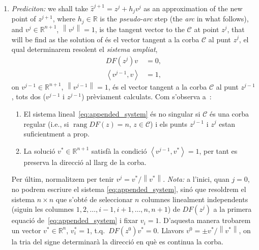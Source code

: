 \documentclass[11pt,reqno,twoside]{article}
\newcommand{\R}{\ensuremath{\mathbb{R}}}
\theoremstyle{remark}
\begin{document}
\begin{enumerate}[label = \emph{\arabic*.}]
  \item \emph{Prediciton:} we shall take $\hat{z}^{j+1} = z^{j} + h_{j}
    v^{j}$ as an approximation of the new point of
    $z^{j+1}$, where $h_{j}\in\R$ is the \emph{pseudo-arc} step (the
    \emph{arc} in what follows), and 
    $v^{j}\in\R^{n+1}$, $\left\|v^{j}\right\| = 1$,
    is the tangent vector to the $\mathcal{C}$ at point $z^{j}$, that will
    be find as the solution of 
    és el vector tangent a la corba $\mathcal{C}$ al punt $z^{j}$, el qual
    determinarem resolent el \emph{sistema ampliat},  
    \begin{equation}\label{eq:appended_system}
      \begin{split}
      DF\left(z^{j}\right)v &= 0,\\
      \left\langle v^{j-1}, v \right\rangle &= 1, 
    \end{split}
  \end{equation}
    on $v^{j-1}\in\R^{n+1}$, $\left\|v^{j-1}\right\|=1$, és el vector
    tangent a la corba $\mathcal{C}$ al punt $z^{j-1}$, tots dos ($v^{j-1}$
    i $z^{j-1}$) prèviament calculats. Com s'observa
    a~\cite{Kuznetsov2004}:
    \begin{enumerate}[label = (\roman*)] 
      \item El sistema lineal~\eqref{eq:appended_system} és no singular si
	$\mathcal{C}$ és una corba regular (i.e., si
	$\mathop{\mathrm{rang}} DF(z) = n$, $z\in\mathcal{C}$) i els punts
	$z^{j-1}$ i $z^{j}$ estan suficientment a prop.
      \item La solució $v^{\ast}\in\R^{n+1}$ satisfà la condició
	  $\left\langle v^{j-1}, v^{\ast}\right\rangle = 1$, per tant es preserva la
	  direcció al llarg de la corba.
     \end{enumerate}
     Per últim, normalitzem per tenir $v^{j} =
     v^{\ast}/\left\|v^{\ast}\right\|$. \emph{Nota:} a l'inici, quan $j =
     0$, no podrem
     escriure el sistema \eqref{eq:appended_system}, sinó que resoldrem el
     sistema $n\times n$ que s'obté de seleccionar $n$ columnes linealment
     independents
     (siguin les columnes $1,2,\dots,i-1,i+1,\dots,n,n+1$) de
     $DF(z^{j})$ a la primera equació 
     de~\eqref{eq:appended_system} i fixar 
     $v_{i} = 1$. D'aquesta manera trobarem un vector $v^{\ast}\in\R^{n}$, 
     $v^{\ast}_{i} = 1$, t.q.~$DF(z^{0})v^{\ast} = 0$. Llavors $v^{0} =
     \pm v^{\ast}/\left\|v^{\ast}\right\|$, on la tria del signe determinarà
     la direcció en què es continua la corba.


\end{enumerate}
\end{document}
